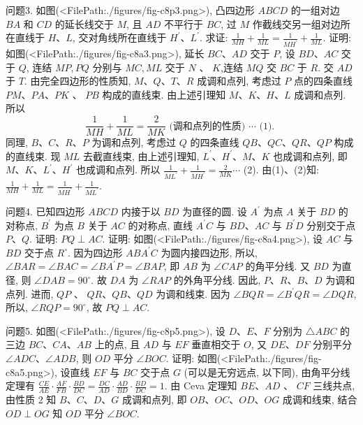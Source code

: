 问题3. 如图(<FilePath:./figures/fig-c8p3.png>), 凸四边形 $A B C D$ 的一组对边 $B A$ 和 $C D$ 的延长线交于 $M$, 且 $A D$ 不平行于 $B C$, 过 $M$ 作截线交另一组对边所在直线于 $H 、 L$, 交对角线所在直线于 $H^{\prime} 、 L^{\prime}$. 求证: $\frac{1}{M H}+\frac{1}{M L}=\frac{1}{M H^{\prime}}+\frac{1}{M L}$.
证明: 如图(<FilePath:./figures/fig-c8a3.png>), 延长 $B C 、 A D$ 交于 $P$, 设 $B D 、 A C$ 交于 $Q$, 连结 $M P, P Q$ 分别与 $M C, M L$ 交于 $N$ 、 $K$,连结 $M Q$ 交 $B C$ 于 $R$. 交 $A D$ 于 $T$.
由完全四边形的性质知, $M 、 Q 、 T 、 R$ 成调和点列, 考虑过 $P$ 点的四条直线 $P M 、 P A 、 P K$ 、 $P B$ 构成的直线束.
由上述引理知 $M 、 K 、 H 、 L$ 成调和点列.
所以
$$
\frac{1}{M H}+\frac{1}{M L}=\frac{2}{M K} \text { (调和点列的性质) } \cdots \text { (1). }
$$
同理, $B 、 C 、 R 、 P$ 为调和点列, 考虑过 $Q$ 的四条直线 $Q B 、 Q C 、 Q R 、 Q P$ 构成的直线束.
现 $M L$ 去截直线束, 由上述引理知, $L^{\prime} 、 H^{\prime} 、 M 、 K$ 也成调和点列, 即 $M 、 K 、 L^{\prime} 、 H^{\prime}$ 也成调和点列.
所以 $\frac{1}{M L^{\prime}}+\frac{1}{M H^{\prime}}=\frac{2}{M K} \cdots$ (2).
由(1)、(2)知: $\frac{1}{M H}+\frac{1}{M L}=\frac{1}{M H^{\prime}}+\frac{1}{M L^{\prime}}$.



问题4. 已知四边形 $A B C D$ 内接于以 $B D$ 为直径的圆.
设 $A^{\prime}$ 为点 $A$ 关于 $B D$ 的对称点, $B^{\prime}$ 为点 $B$ 关于 $A C$ 的对称点, 直线 $A^{\prime} C$ 与 $B D 、 A C$ 与 $B^{\prime} D$ 分别交于点 $P 、 Q$. 证明: $P Q \perp A C$.
证明: 如图(<FilePath:./figures/fig-c8a4.png>), 设 $A C$ 与 $B D$ 交于点 $R^{\circ}$. 因为四边形 $A B A^{\prime} C$ 为圆内接四边形, 所以, $\angle B A R=\angle B A C=\angle B A^{\prime} P=\angle B A P$, 即 $A B$ 为 $\angle C A P$ 的角平分线.
又 $B D$ 为直径, 则 $\angle D A B=90^{\circ}$. 故 $D A$ 为 $\angle R A P$ 的外角平分线.
因此, $P 、 R 、 B 、 D$ 为调和点列.
进而, $Q P$ 、 $Q R 、 Q B 、 Q D$ 为调和线束.
因为 $\angle B Q R=\angle B^{\prime} Q R=\angle D Q R$, 所以, $\angle R Q P=90^{\circ}$, 故 $P Q \perp A C$.



问题5. 如图(<FilePath:./figures/fig-c8p5.png>), 设 $D 、 E 、 F$ 分别为 $\triangle A B C$ 的三边 $B C 、 C A 、 A B$ 上的点, 且 $A D$ 与 $E F$ 垂直相交于 $O$, 又 $D E 、 D F$ 分别平分 $\angle A D C 、 \angle A D B$, 则 $O D$ 平分 $\angle B O C$.
证明: 如图(<FilePath:./figures/fig-c8a5.png>), 设直线 $E F$ 与 $B C$ 交于点 $G$ (可以是无穷远点, 以下同), 由角平分线定理有 $\frac{C E}{A E} \cdot \frac{A F}{F B} \cdot \frac{B D}{D C}=\frac{D C}{A D} \cdot \frac{A D}{B D} \cdot \frac{B D}{D C}=1$. 由 Ceva 定理知 $B E 、 A D$ 、 $C F$ 三线共点, 由性质 2 知 $B 、 C 、 D 、 G$ 成调和点列, 即 $O B 、 O C 、 O D 、 O G$ 成调和线束, 结合 $O D \perp O G$ 知 $O D$ 平分 $\angle B O C$.



